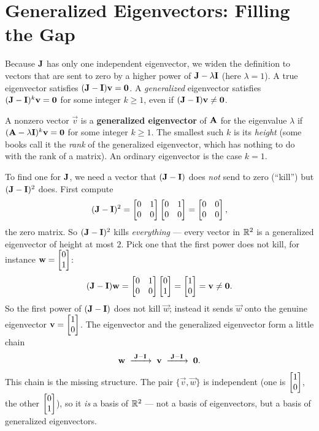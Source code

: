 \section{Generalized Eigenvectors: Filling the Gap}
\label{ch28:generalized}

Because $\mathbf{J}$ has only one independent eigenvector, we widen the definition to
vectors that are sent to zero by a higher power of $\mathbf{J}-\lambda\mathbf{I}$ (here
$\lambda=1$). A true eigenvector satisfies $(\mathbf{J}-\mathbf{I})\mathbf{v}=\mathbf{0}$.
A \emph{generalized} eigenvector satisfies
$(\mathbf{J}-\mathbf{I})^k\mathbf{v}=\mathbf{0}$ for some integer $k\ge 1$, even if
$(\mathbf{J}-\mathbf{I})\mathbf{v}\neq\mathbf{0}$.

\begin{definition}
\label{ch28:def-gen}
A nonzero vector $\vec{v}$ is a \textbf{generalized eigenvector} of $\mathbf{A}$ for the
eigenvalue $\lambda$ if $(\mathbf{A}-\lambda\mathbf{I})^k\mathbf{v}=\mathbf{0}$ for some integer
$k\ge 1$. The smallest such $k$ is its \emph{height} (some books call it the
\emph{rank} of the generalized eigenvector, which has nothing to do with the rank of a
matrix). An ordinary eigenvector is the case $k=1$.
\end{definition}

To find one for $\mathbf{J}$, we need a vector that $(\mathbf{J}-\mathbf{I})$ does \emph{not}
send to zero (``kill'') but $(\mathbf{J}-\mathbf{I})^2$ does. First compute
\[
(\mathbf{J}-\mathbf{I})^2=\begin{bmatrix}0&1\\0&0\end{bmatrix}\begin{bmatrix}0&1\\0&0\end{bmatrix}
=\begin{bmatrix}0&0\\0&0\end{bmatrix},
\]
the zero matrix. So $(\mathbf{J}-\mathbf{I})^2$ kills \emph{everything} --- every vector in
$\mathbb{R}^2$ is a generalized eigenvector of height at most $2$. Pick one that the first power
does not kill, for instance $\mathbf{w}=\begin{bmatrix}0\\1\end{bmatrix}$:
\[
(\mathbf{J}-\mathbf{I})\mathbf{w}=\begin{bmatrix}0&1\\0&0\end{bmatrix}\begin{bmatrix}0\\1\end{bmatrix}=\begin{bmatrix}1\\0\end{bmatrix}=\mathbf{v}\neq\mathbf{0}.
\]
So the first power of $(\mathbf{J}-\mathbf{I})$ does not kill $\vec{w}$; instead it
sends $\vec{w}$ onto the genuine eigenvector $\mathbf{v}=\begin{bmatrix}1\\0\end{bmatrix}$. The eigenvector and
the generalized eigenvector form a little chain
\[
\mathbf{w}\;\xrightarrow{\;\mathbf{J}-\mathbf{I}\;}\;\mathbf{v}\;\xrightarrow{\;\mathbf{J}-\mathbf{I}\;}\;\mathbf{0}.
\]
This chain is the missing structure. The pair $\{\vec{v},\vec{w}\}$ is independent (one
is $\begin{bmatrix}1\\0\end{bmatrix}$, the other $\begin{bmatrix}0\\1\end{bmatrix}$), so it \emph{is} a basis of $\mathbb{R}^2$ --- not
a basis of eigenvectors, but a basis of generalized eigenvectors.

